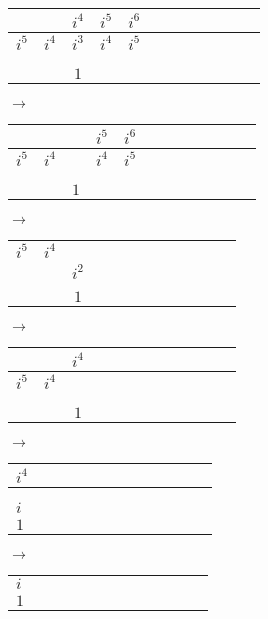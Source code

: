 \documentclass[12pt]{article}
\begin{document}
\begin{tabular}{|l|c|c|c|c|c|c|c|c|c|c|r|}
    \hline
    & & $i^4$ & $i^5$ & $i^6$ \\
    \hline
    $i^5$ & $i^4$ & $i^3$ & $i^4$ & $i^5$ \\
    \hline
    & & & &\\
    \hline
    & & & &\\
    \hline
    & & $1$ & &\\
    \hline
\end{tabular}
$\longrightarrow$
\begin{tabular}{|l|c|c|c|c|c|c|c|c|c|c|r|}
    \hline
    & & & $i^5$ & $i^6$ \\
    \hline
    $i^5$ & $i^4$ & & $i^4$ & $i^5$ \\
    \hline
    & & \color{red}{$i^2$} & &\\
    \hline
    & & & &\\
    \hline
    & & $1$ & &\\
    \hline
\end{tabular}
$\longrightarrow$
\begin{tabular}{|l|c|c|c|c|c|c|c|c|c|c|r|}
    \hline
    & & \color{red}{$i^4$} \\
    \hline
    $i^5$ & $i^4$ & \color{red}{$i^3$}  \\
    \hline
    & & $i^2$ \\
    \hline
    & & \\
    \hline
    & & $1$ \\
    \hline
\end{tabular}
$\longrightarrow$
\begin{tabular}{|l|c|c|c|c|c|c|c|c|c|c|r|}
    \hline
    & & $i^4$ \\
    \hline
    $i^5$ & $i^4$ & \\
    \hline
    & & \\
    \hline
    & & \color{red}{$i$}\\
    \hline
    & & $1$ \\
    \hline
\end{tabular}

$\longrightarrow$
\begin{tabular}{|l|c|c|c|c|c|c|c|c|c|c|r|}
    \hline
    $i^4$ \\
    \hline
    \color{red}{$i^3$}  \\
    \hline
    \\
    \hline
    $i$\\
    \hline
    $1$ \\
    \hline
\end{tabular}
$\longrightarrow$
\begin{tabular}{|l|c|c|c|c|c|c|c|c|c|c|r|}
    \hline
    \color{red}{$i^2$}\\
    \hline
    $i$\\
    \hline
    $1$ \\
    \hline
\end{tabular}
\end{document}
